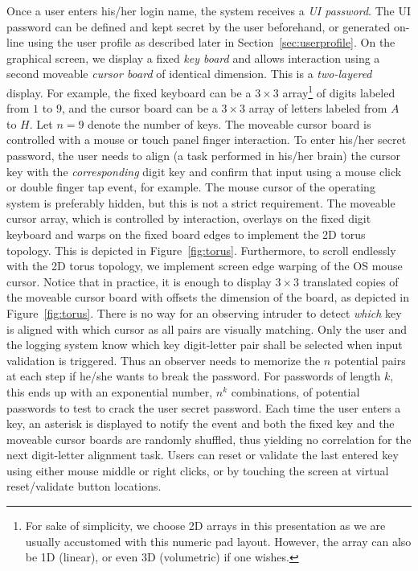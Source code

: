 \documentclass[12pt,onecolumn]{article}
\begin{document}
Once a user enters his/her login name, the system receives a {\em UI password}.
The UI password can be defined and kept secret by the user beforehand, or generated on-line using the user profile as described later in Section~\ref{sec:userprofile}.
On the graphical screen, we display a fixed {\em key board} and allows interaction using a second  moveable {\em cursor board} of identical dimension.
This is a {\em two-layered} display.
For example, the fixed keyboard can be a $3\times 3$ array\footnote{For sake of simplicity, we choose 2D arrays in this presentation as we are usually accustomed with this numeric pad layout. However, the array can also be  1D (linear), or even 3D (volumetric) if one wishes.} of digits labeled from $1$ to $9$, and the cursor board can be a $3\times 3$ array of letters labeled from $A$ to $H$. 
Let $n=9$ denote the number of keys.
The moveable cursor board is controlled with a mouse or touch panel finger interaction.
To enter his/her secret password, the user needs to align (a task performed in his/her brain) the cursor key with the {\em corresponding} digit key and confirm that input using a mouse click or double finger tap event, for example. 
The mouse cursor of the operating system is preferably hidden, but this is not a strict requirement.
The moveable cursor array, which is controlled by interaction, overlays on the fixed digit keyboard and warps on the fixed board edges to implement the 2D torus topology.
This is depicted in Figure~\ref{fig:torus}.
Furthermore, to scroll endlessly with the 2D torus topology, we implement screen edge warping of the OS mouse cursor.
Notice that in practice, it is enough to display $3\times 3$ translated copies of the moveable cursor board with offsets the dimension of the board, as depicted in Figure~\ref{fig:torus}.
There is no way for an observing intruder to detect {\em which} key is aligned with which cursor as all pairs are visually matching.
Only the user and the logging system know which key digit-letter pair shall be selected when input validation is triggered.
Thus an observer needs to memorize the $n$ potential pairs at each step if he/she wants to break the password.
For passwords of length $k$, this ends up with an exponential number, $n^k$ combinations, of potential passwords to test to crack the user secret password.
Each time the user enters a key, an asterisk is displayed to notify the event and both the fixed key  and the moveable cursor  boards are randomly shuffled, thus yielding no correlation for the next digit-letter alignment task.
Users can reset or validate the last entered key using either mouse middle or right clicks, or by touching the screen at virtual reset/validate button locations.
\end{document}
